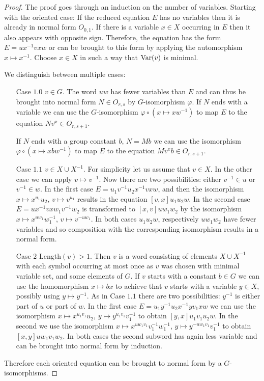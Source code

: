 \documentclass[a4paper,11pt]{amsart}
\begin{document}
\begin{proof}
  The proof goes through an induction on the number of variables.
  Starting with the oriented case: If the reduced equation $E$ has no
  variables then it is already in normal form $O_{0,1}$. If there is a
  variable $x\in X$ occurring in $E$ then it also appears with
  opposite sign.  Therefore, the equation has the form
  $E = ux^{-1}vxw$ or can be brought to this form by applying the
  automorphism $x \mapsto x^{-1}$. Choose $x\in X$ in such a way that
  $\textup{Var}(v)$ is minimal.
 
  We distinguish between multiple cases:
  \begin{itemize}
  \item[Case $1.0$] $v\in G$. The word $uw$ has fewer variables than
    $E$ and can thus be brought into normal form $N\in O_{r,s}$ by
    $G$-isomorphism $\varphi$. If $N$ ends with a variable we can use
    the $G$-isomorphism $\varphi \circ (x\mapsto xw^{-1}) $ to map $E$
    to the equation $Nv^x \in O_{r,s+1}$.
    
    If $N$ ends with a group constant $b$, $N=Mb$ we can use the
    isomorphism $\varphi \circ(x \mapsto xbw^{-1}) $ to map $E$ to the
    equation $Mv^xb\in O_{r,s+1}$.

  \item[Case $1.1$] $v\in X\cup X^{-1}$. For simplicity let us assume
    that $v\in X$. In the other case we can apply $v \mapsto v^{-1}$.
    Now there are two possibilities: either $v^{-1} \in u$ or
    $v^{-1} \in w$. In the first case $E= u_1v^{-1}u_2x^{-1}vxw$, and
    then the isomorphism $x \mapsto x^{u_1}u_2$, $v \mapsto v^{u_1}$
    results in the equation $[v,x]u_1u_2w$. In the second case
    $E= ux^{-1}vxw_1v^{-1}w_2$ is transformed to $[x,v]uw_1w_2$ by the
    isomorphism $x \mapsto x^{uw_1}w_1^{-1}$, $v\mapsto v^{-uw_1}$. In
    both cases $u_1u_2w$, respectively $uw_1w_2$ have fewer variables
    and so composition with the corresponding isomorphism results in a
    normal form.
  \item[Case $2$] Length$(v)>1$. Then $v$ is a word consisting of
    elements $X\cup X^{-1}$ with each symbol occurring at most once as
    $v$ was chosen with minimal variable set, and some elements of
    $G$.  If $v$ starts with a constant $b\in G$ we can use the
    homomorphism $x\mapsto bx$ to achieve that $v$ starts with a
    variable $y\in X$, possibly using $y \mapsto y^{-1}$. As in Case
    $1.1$ there are two possibilities: $y^{-1}$ is either part of $u$
    or part of $w$. In the first case $E= u_1 y^{-1} u_2 x^{-1}yv_1xw$
    we can use the isomorphism $x\mapsto x^{u_1v_1}u_2$,
    $y\mapsto y^{u_1v_1}v_1^{-1}$ to obtain $[y,x]u_1v_1u_2w$. In the
    second we use the isomorphism
    $x\mapsto x^{uw_1v_1}v_1^{-1}w_1^{-1}$,
    $y\mapsto y^{-uw_1v_1}v_1^{-1}$ to obtain $[x,y]uw_1v_1w_2$. In
    both cases the second subword has again less variable and can be
    brought into normal form by induction.
  \end{itemize}
  Therefore each oriented equation can be brought to normal form by a
  $G$-isomorphisms.


\end{proof}
\end{document}
